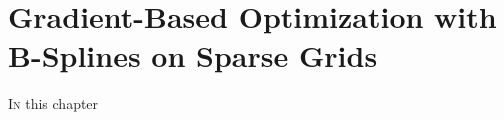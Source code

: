 
\chapter{%
  Gradient-Based Optimization with B-Splines on Sparse Grids%
}

\lettrine{I}{n}
this chapter
\blindtext{}






\cleardoublepage
